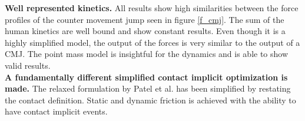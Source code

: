 \documentclass[default,iicol]{sn-jnl}
\begin{document}



\noindent\textbf{Well represented kinetics.} All results show high similarities between the force profiles of the counter movement jump seen in figure \ref{f_cmj}. The sum of the human kinetics are well bound and show constant results. Even though it is a highly simplified model, the output of the forces is very similar to the output of a CMJ. The point mass model is insightful for the dynamics and is able to show valid results. \\

\noindent\textbf{A fundamentally different simplified contact implicit optimization is made.} The relaxed formulation by Patel et al. \cite{patel_contact-implicit_2019} has been simplified by restating the contact definition. Static and dynamic friction is achieved with the ability to have contact implicit events.
\end{document}
